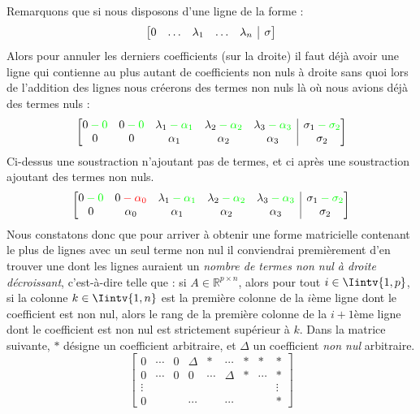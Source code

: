 \documentclass{article}
\newcommand{\R}{\mathbb{R}}
\newcommand{\cross}{\times}
\begin{document}
\noindent Remarquons que si nous disposons d'une ligne de la forme :
$$ 
\left[
\begin{array}{@{}ccccc|c@{}}
0 & \ldots & \lambda_1 & \ldots & \lambda_n & \sigma \\
\end{array}
\right]
$$
\noindent Alors pour annuler les derniers coefficients (sur la droite) il faut déjà avoir une ligne qui contienne au plus autant de coefficients non nuls à droite sans quoi lors de l'addition des lignes nous créerons des termes non nuls là où nous avions déjà des termes nuls :
$$ 
\left[
\begin{array}{@{}ccccc|c@{}}
0 \color{green} -0  & 0\color{green} -0 & \lambda_1 \color{green} -\alpha_1 & \lambda_2 \color{green} -\alpha_2 & \lambda_3\color{green} -\alpha_3 & \sigma_1\color{green} -\sigma_2 \\
0 & 0  & \alpha_1 & \alpha_2 & \alpha_3 & \sigma_2 \\
\end{array}
\right]
$$
Ci-dessus une soustraction n'ajoutant pas de termes, et ci après une soustraction ajoutant des termes non nuls.
$$ 
\left[
\begin{array}{@{}ccccc|c@{}}
0 \color{green} -0  & 0\color{red} -\alpha_0 & \lambda_1 \color{green} -\alpha_1 & \lambda_2 \color{green} -\alpha_2 & \lambda_3\color{green} -\alpha_3 & \sigma_1\color{green} -\sigma_2 \\
0 & \alpha_0  & \alpha_1 & \alpha_2 & \alpha_3 & \sigma_2 \\
\end{array}
\right]
$$
Nous constatons donc que pour arriver à obtenir une forme matricielle contenant le plus de lignes avec un seul terme non nul il conviendrai premièrement d'en trouver une dont les lignes auraient un \textit{nombre de termes non nul à droite décroissant}, c'est-à-dire telle que : si $A \in \R^{p \cross n}$, alors pour tout $i \in \Iintv{1,p}$, si la colonne $k\in \Iintv{1,n}$ est la première colonne de la $i$ème ligne dont le coefficient est non nul, alors le rang de la première colonne de la $i+1$ème ligne dont le coefficient est non nul est strictement supérieur à $k$. Dans la matrice suivante, $*$ désigne un coefficient arbitraire, et $\Delta$ un coefficient \textit{non nul} arbitraire.
$$\begin{bmatrix}
0 & \cdots & 0 & \Delta & * & \cdots & * & * & *\\
0 &\cdots & 0 & 0 & \cdots & \Delta & * &\cdots & *\\
\vdots &&&&&&&&\vdots \\
0 & &&\cdots&&\cdots&&& *
\end{bmatrix}
$$
\end{document}
